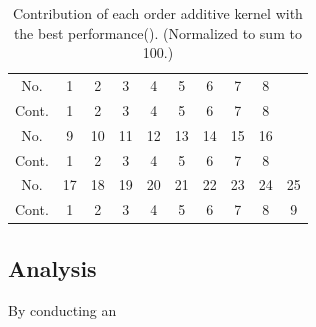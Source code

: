 \begin{table}[htp]
\centering
{\small
\begin{tabular}{|c|ccccccccc|}
    \hline
	   No. & 1 & 2 & 3 & 4 & 5 & 6 & 7 & 8 &\\ 
	   Cont. & 1 & 2 & 3 & 4 & 5 & 6 & 7 & 8 &\\ 
    \hline
            No. & 9 & 10 & 11 & 12 & 13 & 14 & 15 & 16 &\\
            Cont. & 1 & 2 & 3 & 4 & 5 & 6 & 7 & 8 &\\ 
   \hline
   	   No. & 17 & 18 & 19 & 20 & 21 & 22 & 23 & 24 & 25\\ 
	   Cont. & 1 & 2 & 3 & 4 & 5 & 6 & 7 & 8 & 9\\ 
   \hline
\end{tabular}
}
\caption{Contribution of each order additive kernel with the best performance(). (Normalized to sum to 100.)}
\label{tab:contribution}
\end{table}



\subsection{Analysis}
By conducting an 







